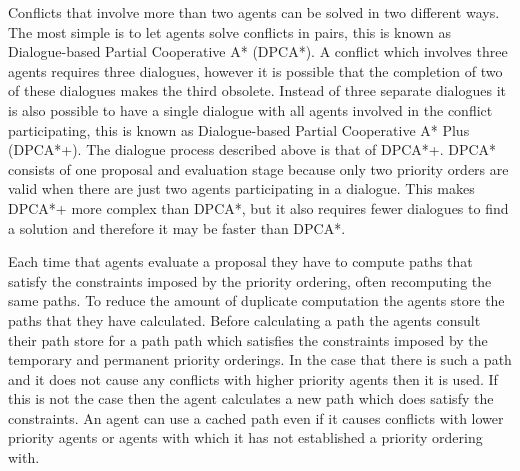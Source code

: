 Conflicts that involve more than two agents can be solved in two different
ways. The most simple is to let agents solve conflicts in pairs, this is known
as Dialogue-based Partial Cooperative A* (DPCA*). A conflict which involves
three agents requires three dialogues, however it is possible that the 
completion of two of these dialogues makes the third obsolete. Instead of three 
separate dialogues it is also possible to have a single dialogue with all 
agents involved in the conflict participating, this is known as
Dialogue-based Partial Cooperative A* Plus (DPCA*+). The dialogue process 
described above is that of DPCA*+. DPCA* consists of one proposal and 
evaluation stage because only two priority orders are valid when there 
are just two agents participating in a dialogue.
This makes DPCA*+ more complex than DPCA*, but it also requires fewer dialogues 
to find a solution and therefore it may be faster than DPCA*.

Each time that agents evaluate a proposal they have to compute paths that
satisfy the constraints imposed by the priority ordering, often recomputing
the same paths. To reduce the amount of duplicate computation the
agents store the paths that they have calculated. Before calculating a path
the agents consult their path store for a path path which satisfies the
constraints imposed by the temporary and permanent priority orderings. In the 
case
that there is such a path and it does not cause any conflicts with higher
priority agents then it is used. If this is not the case then the agent
calculates a new path which does satisfy the constraints. An agent can use a 
cached path even if it causes
conflicts with lower priority agents or agents with which it has not
established a priority ordering with.


